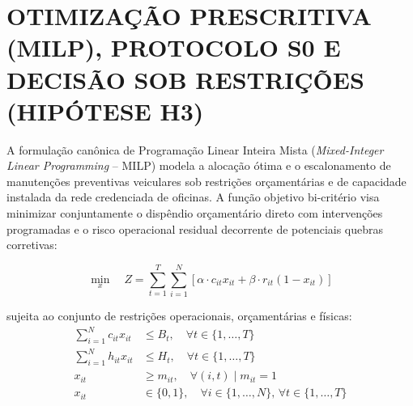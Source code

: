 \chapter{OTIMIZAÇÃO PRESCRITIVA (MILP), PROTOCOLO S0 E DECISÃO SOB RESTRIÇÕES (HIPÓTESE H3)}
\label{cap:milp}

A formulação canônica de Programação Linear Inteira Mista (\textit{Mixed-Integer Linear Programming} -- MILP) modela a alocação ótima e o escalonamento de manutenções preventivas veiculares sob restrições orçamentárias e de capacidade instalada da rede credenciada de oficinas. A função objetivo bi-critério visa minimizar conjuntamente o dispêndio orçamentário direto com intervenções programadas e o risco operacional residual decorrente de potenciais quebras corretivas:

\begin{equation}
    \min_{x} \quad Z = \sum_{t=1}^{T} \sum_{i=1}^{N} \left[ \alpha \cdot c_{it} x_{it} + \beta \cdot r_{it} (1 - x_{it}) \right]
    \label{eq:milp_objetivo}
\end{equation}

\noindent sujeita ao conjunto de restrições operacionais, orçamentárias e físicas:
\begin{align}
    \sum_{i=1}^{N} c_{it} x_{it} &\le B_t, \quad \forall t \in \{1, \dots, T\} \label{eq:milp_orcamento} \\
    \sum_{i=1}^{N} h_{it} x_{it} &\le H_t, \quad \forall t \in \{1, \dots, T\} \label{eq:milp_capacidade} \\
    x_{it} &\ge m_{it}, \quad \forall (i, t) \mid m_{it} = 1 \label{eq:milp_obrigatoria} \\
    x_{it} &\in \{0, 1\}, \quad \forall i \in \{1, \dots, N\}, \, \forall t \in \{1, \dots, T\} \label{eq:milp_dominio}
\end{align}

